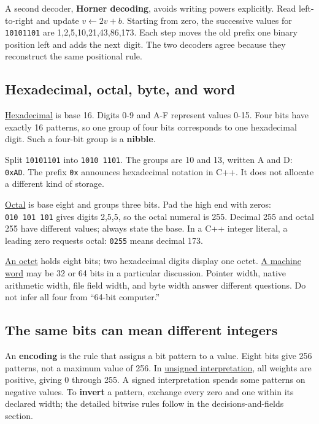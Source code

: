 A second decoder, \textbf{Horner decoding}, avoids writing powers explicitly. Read left-to-right and update \(v\leftarrow2v+b\). Starting from zero, the successive values for \texttt{10101101} are 1,2,5,10,21,43,86,173. Each step moves the old prefix one binary position left and adds the next digit. The two decoders agree because they reconstruct the same positional rule.

\subsection{Hexadecimal, octal, byte, and word}\label{01-foundations-i-ch001-hexadecimal-octal-byte-and-word}

\hyperref[appendix-6b8075763724]{Hexadecimal} is base 16. Digits 0-9 and A-F represent values 0-15. Four bits have exactly 16 patterns, so one group of four bits corresponds to one hexadecimal digit. Such a four-bit group is a \textbf{nibble}.

Split \texttt{10101101} into \texttt{1010\ 1101}. The groups are 10 and 13, written A and D: \texttt{0xAD}. The prefix \texttt{0x} announces hexadecimal notation in C++. It does not allocate a different kind of storage.

\hyperref[appendix-17fc1bc8b305]{Octal} is base eight and groups three bits. Pad the high end with zeros: \texttt{010\ 101\ 101} gives digits 2,5,5, so the octal numeral is 255. Decimal 255 and octal 255 have different values; always state the base. In a C++ integer literal, a leading zero requests octal: \texttt{0255} means decimal 173.

\hyperref[appendix-5bee2df85484]{An octet} holds eight bits; two hexadecimal digits display one octet. \hyperref[appendix-d67a19507dc5]{A machine word} may be 32 or 64 bits in a particular discussion. Pointer width, native arithmetic width, file field width, and byte width answer different questions. Do not infer all four from ``64-bit computer.''

\subsection{The same bits can mean different integers}\label{01-foundations-i-ch001-the-same-bits-can-mean-different-integers}

An \textbf{encoding} is the rule that assigns a bit pattern to a value. Eight bits give 256 patterns, not a maximum value of 256. In \hyperref[appendix-c99977d88b33]{unsigned interpretation}, all weights are positive, giving 0 through 255. A signed interpretation spends some patterns on negative values. To \textbf{invert} a pattern, exchange every zero and one within its declared width; the detailed bitwise rules follow in the decisions-and-fields section.

